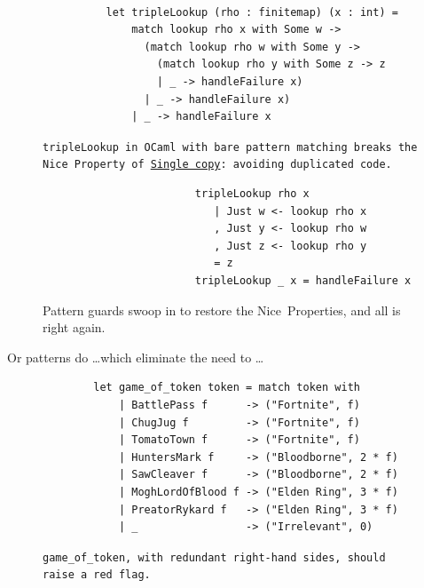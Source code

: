\documentclass[article,screen,12pt, nonacm]{acmart}
\begin{document}
        \begin{figure}[ht]
        \begin{verbatim}

          let tripleLookup (rho : finitemap) (x : int) =
              match lookup rho x with Some w -> 
                (match lookup rho w with Some y -> 
                  (match lookup rho y with Some z -> z
                  | _ -> handleFailure x)
                | _ -> handleFailure x)
              | _ -> handleFailure x
            \end{verbatim}
        \caption{\tt{tripleLookup} in OCaml with bare pattern matching breaks
         the Nice~Property of~\hyperref[p2]{Single copy}: avoiding duplicated
         code.} 
                    
        \label{fig:pmtriplelookup}
    \end{figure}

     \begin{figure}
        \begin{center}
        \begin{verbatim}
                        tripleLookup rho x
                           | Just w <- lookup rho x
                           , Just y <- lookup rho w
                           , Just z <- lookup rho y
                           = z
                        tripleLookup _ x = handleFailure x
        \end{verbatim}
        \end{center}    
    \caption{Pattern guards swoop in to restore the Nice~Properties, and all is
    right again.} 
    \label{fig:guardtriplelookup}
    \end{figure}


    Or patterns do \dots which eliminate the need to \dots

     \begin{figure}
            \begin{center}
                \begin{verbatim}
        let game_of_token token = match token with 
            | BattlePass f      -> ("Fortnite", f)
            | ChugJug f         -> ("Fortnite", f)
            | TomatoTown f      -> ("Fortnite", f)
            | HuntersMark f     -> ("Bloodborne", 2 * f)
            | SawCleaver f      -> ("Bloodborne", 2 * f)
            | MoghLordOfBlood f -> ("Elden Ring", 3 * f)
            | PreatorRykard f   -> ("Elden Ring", 3 * f)
            | _                 -> ("Irrelevant", 0)
                \end{verbatim}
            \end{center}    

        \caption{\tt{game\_of\_token}, with redundant right-hand sides,
        should raise a red flag.} 
        \label{fig:baregot}
        \end{figure}
\end{document}
